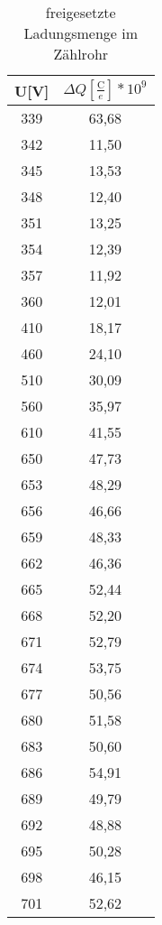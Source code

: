 \begin{table}[h]
	\begin{center}
		\begin{tabular}{cc}
			U[V]&$\Delta Q [\frac{\text{C}}{e}] * 10^9$ \\ \hline
			339&63,68\\
			342&11,50\\
			345&13,53\\
			348&12,40\\
			351&13,25\\
			354&12,39\\
			357&11,92\\
			360&12,01\\
			410&18,17\\
			460&24,10\\
			510&30,09\\
			560&35,97\\
			610&41,55\\
			650&47,73\\
			653&48,29\\
			656&46,66\\
			659&48,33\\
			662&46,36\\
			665&52,44\\
			668&52,20\\
			671&52,79\\
			674&53,75\\
			677&50,56\\
			680&51,58\\
			683&50,60\\
			686&54,91\\
			689&49,79\\
			692&48,88\\
			695&50,28\\
			698&46,15\\
			701&52,62
		\end{tabular}
		\caption{freigesetzte Ladungsmenge im Zählrohr}
		\label{tabd1}
	\end{center}
\end{table}
